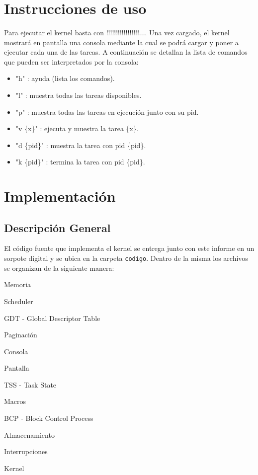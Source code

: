 \documentclass[11pt, a4paper]{article}
\begin{document}
\section{Instrucciones de uso}
\paragraph{}
Para ejecutar el kernel basta con !!!!!!!!!!!!!!!!!.... Una vez cargado, el kernel mostrará en pantalla una consola mediante la cual se podrá cargar y poner a ejecutar cada una de las tareas. A continuación se detallan la lista de comandos que pueden ser interpretados por la consola:
\begin{itemize}
\item "h" : ayuda (lista los comandos).
\item "l" : muestra todas las tareas disponibles.
\item "p" : muestra todas las tareas en ejecuci\'on junto con su pid.
\item "v \{x\}" : ejecuta y muestra la tarea \{x\}.
\item "d \{pid\}" : muestra la tarea con pid \{pid\}.
\item "k \{pid\}" : termina la tarea con pid \{pid\}.

\end{itemize}


\section{Implementación}
\subsection{Descripción General}
El código fuente que implementa el kernel se entrega junto con este informe en un sorpote digital y se ubica en la carpeta \texttt{codigo}. Dentro de la misma los archivos se organizan de la siguiente manera:
\begin{center}
\begin{shortitemize}
\setlength{\shortitemwidth}{200pt}
\item Memoria
\item Scheduler
\item GDT - Global Descriptor Table
\item Paginación				
\item Consola
\item Pantalla
\item TSS - Task State
\item Macros
\item BCP - Block Control Process
\item Almacenamiento
\item Interrupciones							
\item Kernel
\end{shortitemize}
\end{center}		
\end{document}
